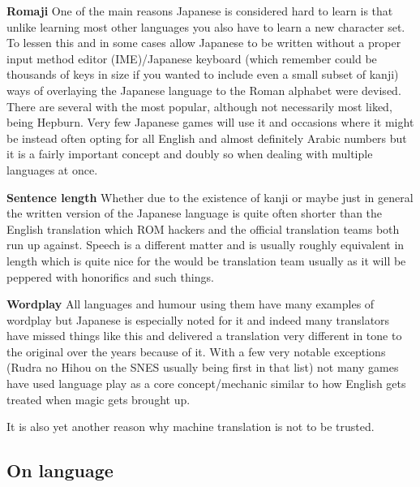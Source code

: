 \documentclass[
]{book}
\begin{document}
\textbf{Romaji} One of the main reasons Japanese is considered hard to learn is that unlike learning most other languages you also have to learn a new character set. To lessen this and in some cases allow Japanese to be written without a proper input method editor (IME)/Japanese keyboard (which remember could be thousands of keys in size if you wanted to include even a small subset of kanji) ways of overlaying the Japanese language to the Roman alphabet were devised. There are several with the most popular, although not necessarily most liked, being Hepburn. Very few Japanese games will use it and occasions where it might be instead often opting for all English and almost definitely Arabic numbers but it is a fairly important concept and doubly so when dealing with multiple languages at once.

\textbf{Sentence length} Whether due to the existence of kanji or maybe just in general the written version of the Japanese language is quite often shorter than the English translation which ROM hackers and the official translation teams both run up against. Speech is a different matter and is usually roughly equivalent in length which is quite nice for the would be translation team usually as it will be peppered with honorifics and such things.

\textbf{Wordplay} All languages and humour using them have many examples of wordplay but Japanese is especially noted for it and indeed many translators have missed things like this and delivered a translation very different in tone to the original over the years because of it. With a few very notable exceptions (Rudra no Hihou on the SNES usually being first in that list) not many games have used language play as a core concept/mechanic similar to how English gets treated when magic gets brought up.

It is also yet another reason why machine translation is not to be trusted.

\hypertarget{on-language}{%
\subsection{On language}\label{on-language}}
\end{document}
